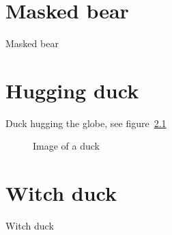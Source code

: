 \chapter{Masked bear}

Masked bear


\cleardoublepage


\chapter{Hugging duck}

Duck hugging the globe, see figure~\ref{fig:duck}

\begin{figure}
\caption{Image of a duck\label{fig:duck}}
\end{figure}


\chapter{Witch duck}

Witch duck


